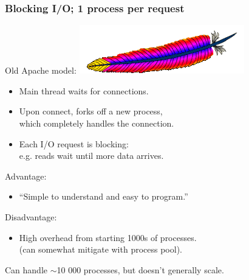 \begin{frame}
  \frametitle{Blocking I/O; 1 process per request}

  
  Old Apache model: \hfill \includegraphics[width=.2\textwidth]{images/httpd_logo_wide_new}

  \begin{itemize}
    \item Main thread waits for connections.
    \item Upon connect, forks off a new process, \\which completely
      handles the connection.
    \item Each I/O request is blocking: \\ e.g. reads wait until more data arrives.
  \end{itemize}

  Advantage: 
  \begin{itemize}
    \item ``Simple to understand and easy to program.''
  \end{itemize}

  Disadvantage:
  \begin{itemize}
    \item High overhead from starting 1000s of processes.\\
      (can somewhat mitigate with process pool).
  \end{itemize}
  Can handle $\sim$10 000 processes, but doesn't generally scale.

  

\end{frame}


